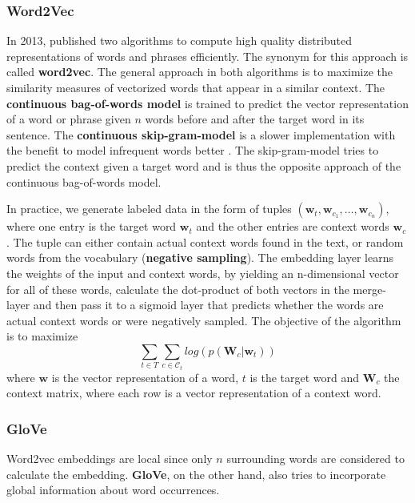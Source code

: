 \subsubsection{Word2Vec}
  In 2013, \citeauthor{Mikolov2013} published two algorithms to compute high quality distributed representations of words and phrases efficiently.
  The synonym for this approach is called \textbf{word2vec}.
  The general approach in both algorithms is to maximize the similarity measures of vectorized words that appear in a similar context.
  The \textbf{continuous bag-of-words model} is trained to predict the vector representation of a word or phrase given $n$ words before and after the target word in its sentence.
  The \textbf{continuous skip-gram-model} is a slower implementation with the benefit to model infrequent words better \citep{word2vec}.
  The skip-gram-model tries to predict the context given a target word and is thus the opposite approach of the continuous bag-of-words model.

  In practice, we generate labeled data in the form of tuples $(\mathbf{w}_t, \mathbf{w}_{c_{1}}, \dots, \mathbf{w}_{c_{n}})$, where one entry is the target word $\mathbf{w}_t$ and the other entries are context words $\mathbf{w}_c$.
  The tuple can either contain actual context words found in the text, or random words from the vocabulary (\textbf{negative sampling}).
  The embedding layer learns the weights of the input and context words, by yielding an n-dimensional vector for all of these words, calculate the dot-product of both vectors in the merge-layer and then pass it to a sigmoid layer that predicts whether the words are actual context words or were negatively sampled.
  The objective of the algorithm is to maximize
  \[\sum_{t \in T} \sum_{c \in \mathcal{C}_t} log( p(\mathbf{W}_c|\mathbf{w}_t))\]
  where $\mathbf{w}$ is the vector representation of a word, $t$ is the target word and $\mathbf{W}_c$ the context matrix, where each row is a vector representation of a context word.

\subsubsection{GloVe}
  Word2vec embeddings are local since only $n$ surrounding words are considered to calculate the embedding.
  \textbf{GloVe}, on the other hand, also tries to incorporate global information about word occurrences.

